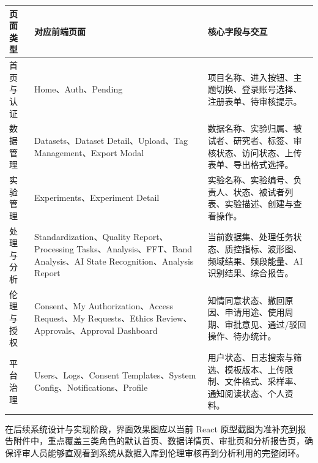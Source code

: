 \begin{longtable}{|p{34mm}|p{52mm}|p{60mm}|}
\hline
\textbf{页面类型} & \textbf{对应前端页面} & \textbf{核心字段与交互} \\
\hline
首页与认证 & Home、Auth、Pending & 项目名称、进入按钮、主题切换、登录账号选择、注册表单、待审核提示。 \\
\hline
数据管理 & Datasets、Dataset Detail、Upload、Tag Management、Export Modal & 数据名称、实验归属、被试者、研究者、标签、审核状态、访问状态、上传表单、导出格式选择。 \\
\hline
实验管理 & Experiments、Experiment Detail & 实验名称、实验编号、负责人、状态、被试者列表、实验描述、创建与查看操作。 \\
\hline
处理与分析 & Standardization、Quality Report、Processing Tasks、Analysis、FFT、Band Analysis、AI State Recognition、Analysis Report & 当前数据集、处理任务状态、质控指标、波形图、频域结果、频段能量、AI 识别结果、综合报告。 \\
\hline
伦理与授权 & Consent、My Authorization、Access Request、My Requests、Ethics Review、Approvals、Approval Dashboard & 知情同意状态、撤回原因、申请用途、使用周期、审批意见、通过/驳回操作、待办统计。 \\
\hline
平台治理 & Users、Logs、Consent Templates、System Config、Notifications、Profile & 用户状态、日志搜索与筛选、模板版本、上传限制、文件格式、采样率、通知阅读状态、个人资料。 \\
\hline
\end{longtable}

在后续系统设计与实现阶段，界面效果图应以当前 React 原型截图为准补充到报告附件中，重点覆盖三类角色的默认首页、数据详情页、审批页和分析报告页，确保评审人员能够直观看到系统从数据入库到伦理审核再到分析利用的完整闭环。
